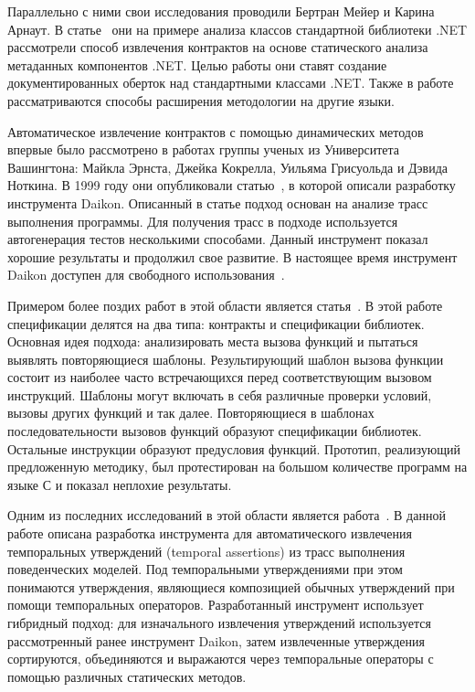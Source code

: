 Параллельно с ними свои исследования проводили Бертран Мейер и Карина Арнаут. В статье~\cite{uncoveringHiddenContracts} они на примере анализа классов стандартной библиотеки .NET рассмотрели способ извлечения контрактов на основе статического анализа метаданных компонентов .NET. Целью работы они ставят создание документированных оберток над стандартными классами .NET. Также в работе рассматриваются способы расширения методологии на другие языки. 

Автоматическое извлечение контрактов с помощью динамических методов впервые было рассмотрено в работах группы ученых из Университета Вашингтона: Майкла Эрнста, Джейка Кокрелла, Уильяма Грисуольда и Дэвида Ноткина. В 1999 году они опубликовали статью~\cite{discoveringInvariants}, в которой описали разработку инструмента Daikon. Описанный в статье подход основан на анализе трасс выполнения программы. Для получения трасс в подходе используется автогенерация тестов несколькими способами. Данный инструмент показал хорошие результаты и продолжил свое развитие. В настоящее время инструмент Daikon доступен для свободного использования~\cite{daikon}.

Примером более поздих работ в этой области является статья~\cite{staticPredicateMining}. В этой работе спецификации делятся на два типа: контракты и спецификации библиотек. Основная идея подхода: анализировать места вызова функций и пытаться выявлять повторяющиеся шаблоны. Результирующий шаблон вызова функции состоит из наиболее часто встречающихся перед соответствующим вызовом инструкций. Шаблоны могут включать в себя различные проверки условий, вызовы других функций и так далее. Повторяющиеся в шаблонах последовательности вызовов функций образуют спецификации библиотек. Остальные инструкции образуют предусловия функций. Прототип, реализующий предложенную методику, был протестирован на большом количестве программ на языке С и показал неплохие результаты.

Одним из последних исследований в этой области является работа~\cite{automiticAssertionsExtraction}. В данной работе описана разработка инструмента для автоматического извлечения темпоральных утверждений (temporal assertions) из трасс выполнения поведенческих моделей. Под темпоральными утверждениями при этом понимаются утверждения, являющиеся композицией обычных утверждений при помощи темпоральных операторов. Разработанный инструмент использует гибридный подход: для изначального извлечения утверждений используется рассмотренный ранее инструмент Daikon, затем извлеченные утверждения сортируются, объединяются и выражаются через темпоральные операторы с помощью различных статических методов.

